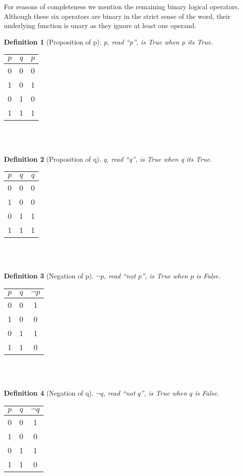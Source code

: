 \documentclass[10pt,a4paper,draft,titlepage,onecolumn]{book}
\newtheorem{definition}{Definition}[section]
\begin{document}
For reasons of completeness we mention the remaining binary logical operators.
Although these six operators are binary in the strict sense of the word, their underlying function is unary as they ignore at least one operand. 


\begin{definition}[Proposition of p] p, read ``p'', is True when p its True.
\end{definition}
\begin{tabular}{ |c|c|c| }
 \hline
 $p$ & $q$ &  $p$ \\
 \hline
 0 & 0 & 0 \\ 
 1 & 0 & 1\\
 0 & 1 & 0 \\
 1 & 1 & 1\\
 \hline
\end{tabular}\\\\


\begin{definition}[Proposition of q] q, read ``q'', is True when q its True.
\end{definition}
\begin{tabular}{ |c|c|c| }
 \hline
 $p$ & $q$ &  $q$ \\
 \hline
 0 & 0 & 0 \\ 
 1 & 0 & 0\\
 0 & 1 & 1 \\
 1 & 1 & 1\\
 \hline
\end{tabular}\\\\


\begin{definition}[Negation of p] ${\neg}p$, read ``not $p$'', is True when $p$ is False.
\end{definition}
\begin{tabular}{ |c|c|c| }
 \hline
 $p$ & $q$ &  ${\neg}p$  \\
 \hline
 0 & 0 & 1 \\
 1 & 0 & 0\\
 0 & 1 & 1\\
 1 & 1 & 0\\
 \hline
\end{tabular}\\\\

\begin{definition}[Negation of q] ${\neg}q$, read ``not $q$'', is True when $q$ is False.
\end{definition}
\begin{tabular}{ |c|c|c| }
 \hline
 $p$ & $q$ &  ${\neg}q$  \\
 \hline
 0 & 0 & 1 \\
 1 & 0 & 0\\
 0 & 1 & 1\\
 1 & 1 & 0\\
 \hline
\end{tabular}\\\\
\end{document}
